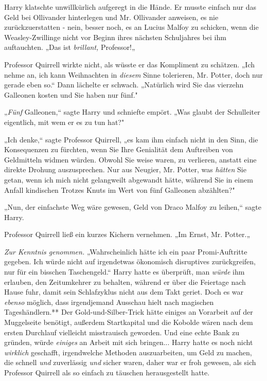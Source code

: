 {Harry klatschte unwillkürlich aufgeregt in die Hände. Er musste einfach nur das Geld bei Ollivander hinterlegen und Mr. Ollivander anweisen, es nie zurückzuerstatten - nein, besser noch, es an Lucius Malfoy zu schicken, wenn die Weasley-Zwillinge nicht vor Beginn ihres nächsten Schuljahres bei ihm auftauchten. „Das ist \emph{brillant,} Professor!„

Professor Quirrell wirkte nicht, als wüsste er das Kompliment zu schätzen. „Ich nehme an, ich kann Weihnachten in \emph{diesem} Sinne tolerieren, Mr. Potter, doch nur gerade eben so.“ Dann lächelte er schwach. „Natürlich wird Sie das vierzehn Galleonen kosten und Sie haben nur fünf."

„\emph{Fünf} Galleonen,“ sagte Harry und schniefte empört. „Was glaubt der Schulleiter eigentlich, mit wem er es zu tun hat?"

„Ich denke,“ sagte Professor Quirrell, „es kam ihm einfach nicht in den Sinn, die Konsequenzen zu fürchten, wenn Sie Ihre Genialität dem Auftreiben von Geldmitteln widmen würden. Obwohl Sie weise waren, zu verlieren, anstatt eine direkte Drohung auszusprechen. Nur aus Neugier, Mr. Potter, was \emph{hätten} Sie getan, wenn ich mich nicht gelangweilt abgewandt hätte, während Sie in einem Anfall kindischen Trotzes Knuts im Wert von fünf Galleonen abzählten?"

„Nun, der einfachste Weg wäre gewesen, Geld von Draco Malfoy zu leihen,“ sagte Harry.

Professor Quirrell ließ ein kurzes Kichern vernehmen. „Im Ernst, Mr. Potter.„

\emph{Zur Kenntnis genommen.} „Wahrscheinlich hätte ich ein paar Promi-Auftritte gegeben. Ich würde nicht auf irgendetwas ökonomisch disruptives zurückgreifen, nur für ein bisschen Taschengeld.“ Harry hatte es überprüft, man \emph{würde} ihm erlauben, den Zeitumkehrer zu behalten, während er über die Feiertage nach Hause fuhr, damit sein Schlafzyklus nicht aus dem Takt geriet. Doch es war \emph{ebenso} möglich, dass irgendjemand Ausschau hielt nach magischen Tageshändlern.** Der Gold-und-Silber-Trick hätte einiges an Vorarbeit auf der Muggelseite benötigt, außerdem Startkapital und die Kobolde wären nach dem ersten Durchlauf vielleicht misstrauisch geworden. Und eine echte Bank zu gründen, würde \emph{einiges} an Arbeit mit sich bringen... Harry hatte es noch nicht \emph{wirklich} geschafft, irgendwelche Methoden auszuarbeiten, um Geld zu machen, die schnell \emph{und} zuverlässig \emph{und} sicher waren, daher war er froh gewesen, als sich Professor Quirrell als so einfach zu täuschen herausgestellt hatte.

}
